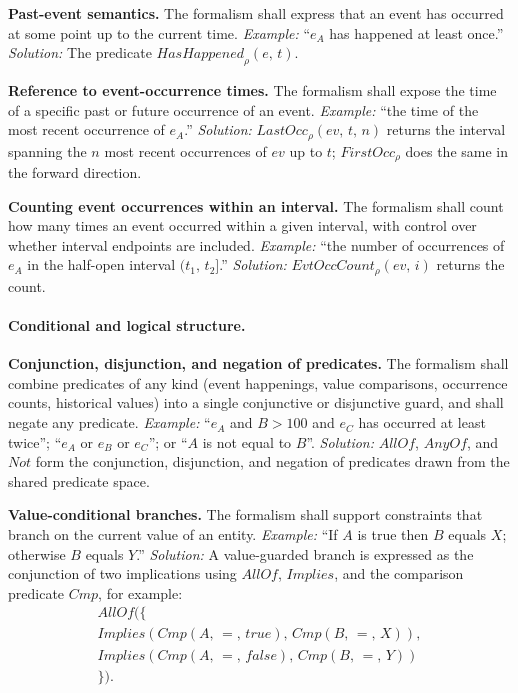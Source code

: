 \textbf{Past-event semantics.} The formalism shall express that an event has occurred at some point up to the current time. \textit{Example:} ``$e_A$ has happened at least once.'' \textit{Solution:} The predicate $\mathit{HasHappened}_\rho(e,\, t)$.

\textbf{Reference to event-occurrence times.} The formalism shall expose the time of a specific past or future occurrence of an event. \textit{Example:} ``the time of the most recent occurrence of $e_A$.'' \textit{Solution:} $\mathit{LastOcc}_\rho(ev,\, t,\, n)$ returns the interval spanning the $n$ most recent occurrences of $ev$ up to $t$; $\mathit{FirstOcc}_\rho$ does the same in the forward direction.

\textbf{Counting event occurrences within an interval.} The formalism shall count how many times an event occurred within a given interval, with control over whether interval endpoints are included. \textit{Example:} ``the number of occurrences of $e_A$ in the half-open interval $(t_1,\, t_2]$.'' \textit{Solution:} $\mathit{EvtOccCount}_\rho(ev,\, i)$ returns the count.

\paragraph{Conditional and logical structure.}

\textbf{Conjunction, disjunction, and negation of predicates.} The formalism shall combine predicates of any kind (event happenings, value comparisons, occurrence counts, historical values) into a single conjunctive or disjunctive guard, and shall negate any predicate. \textit{Example:} ``$e_A$ and $B > 100$ and $e_C$ has occurred at least twice''; ``$e_A$ or $e_B$ or $e_C$''; or ``$A$ is not equal to $B$''. \textit{Solution:} $\mathit{AllOf}$, $\mathit{AnyOf}$, and $\mathit{Not}$ form the conjunction, disjunction, and negation of predicates drawn from the shared predicate space.

\textbf{Value-conditional branches.} The formalism shall support constraints that branch on the current value of an entity. \textit{Example:} ``If $A$ is true then $B$ equals $X$; otherwise $B$ equals $Y$.'' \textit{Solution:} A value-guarded branch is expressed as the conjunction of two implications using $\mathit{AllOf}$, $\mathit{Implies}$, and the comparison predicate $\mathit{Cmp}$, for example:
\begin{multline*}
\mathit{AllOf}\bigl(\{\\
  \mathit{Implies}(\mathit{Cmp}(A,\, =,\, \mathit{true}),\, \mathit{Cmp}(B,\, =,\, X)),\\
  \mathit{Implies}(\mathit{Cmp}(A,\, =,\, \mathit{false}),\, \mathit{Cmp}(B,\, =,\, Y))\\
\}\bigr).
\end{multline*}

